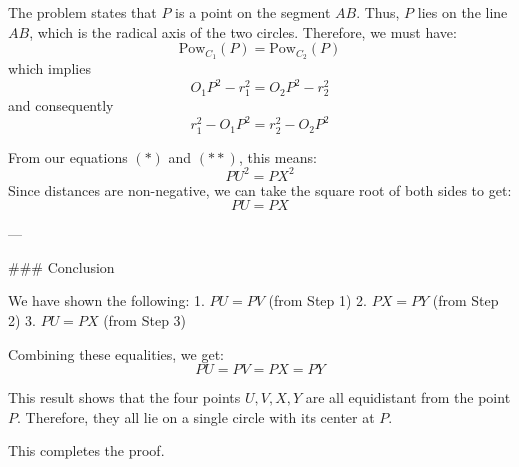 The problem states that $P$ is a point on the segment $AB$. Thus, $P$ lies on the line $AB$, which is the radical axis of the two circles.
Therefore, we must have:
$$\text{Pow}_{C_1}(P) = \text{Pow}_{C_2}(P)$$
which implies
$$O_1P^2 - r_1^2 = O_2P^2 - r_2^2$$
and consequently
$$r_1^2 - O_1P^2 = r_2^2 - O_2P^2$$

From our equations $(*)$ and $(**)$, this means:
$$PU^2 = PX^2$$
Since distances are non-negative, we can take the square root of both sides to get:
$$PU = PX$$

---

### Conclusion

We have shown the following:
1.  $PU = PV$ (from Step 1)
2.  $PX = PY$ (from Step 2)
3.  $PU = PX$ (from Step 3)

Combining these equalities, we get:
$$PU = PV = PX = PY$$

This result shows that the four points $U, V, X, Y$ are all equidistant from the point $P$. Therefore, they all lie on a single circle with its center at $P$.

This completes the proof.